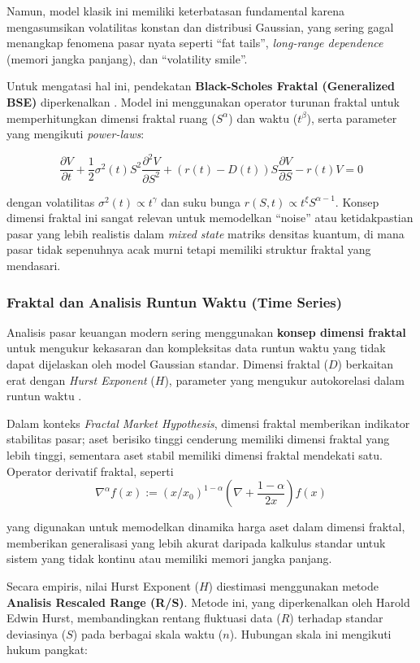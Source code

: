 Namun, model klasik ini memiliki keterbatasan fundamental karena mengasumsikan volatilitas konstan dan distribusi Gaussian, yang sering gagal menangkap fenomena pasar nyata seperti ``fat tails'', \textit{long-range dependence} (memori jangka panjang), dan ``volatility smile''.

Untuk mengatasi hal ini, pendekatan \textbf{Black-Scholes Fraktal (Generalized BSE)} diperkenalkan \citep{el-nabulsi_qualitative_2025}. Model ini menggunakan operator turunan fraktal untuk memperhitungkan dimensi fraktal ruang ($S^\alpha$) dan waktu ($t^\beta$), serta parameter yang mengikuti \textit{power-laws}:

\[ \frac{\partial V}{\partial t} + \frac{1}{2}\sigma^2(t)S^2 \frac{\partial^2 V}{\partial S^2} + (r(t) - D(t))S \frac{\partial V}{\partial S} - r(t)V = 0 \]

dengan volatilitas $\sigma^2(t) \propto t^\gamma$ dan suku bunga $r(S,t) \propto t^\xi S^{\alpha-1}$. Konsep dimensi fraktal ini sangat relevan untuk memodelkan ``noise'' atau ketidakpastian pasar yang lebih realistis dalam \textit{mixed state} matriks densitas kuantum, di mana pasar tidak sepenuhnya acak murni tetapi memiliki struktur fraktal yang mendasari.

\subsubsection{Fraktal dan Analisis Runtun Waktu (Time Series)}
Analisis pasar keuangan modern sering menggunakan \textbf{konsep dimensi fraktal} untuk mengukur kekasaran dan kompleksitas data runtun waktu yang tidak dapat dijelaskan oleh model Gaussian standar. Dimensi fraktal ($D$) berkaitan erat dengan \textit{Hurst Exponent} ($H$), parameter yang mengukur autokorelasi dalam runtun waktu \citep{el-nabulsi_qualitative_2025}.

Dalam konteks \textit{Fractal Market Hypothesis}, dimensi fraktal memberikan indikator stabilitas pasar; aset berisiko tinggi cenderung memiliki dimensi fraktal yang lebih tinggi, sementara aset stabil memiliki dimensi fraktal mendekati satu. Operator derivatif fraktal, seperti
\[ \nabla^\alpha f(x) := (x/x_0)^{1-\alpha}(\nabla + \frac{1-\alpha}{2x})f(x) \]

yang digunakan untuk memodelkan dinamika harga aset dalam dimensi fraktal, memberikan generalisasi yang lebih akurat daripada kalkulus standar untuk sistem yang tidak kontinu atau memiliki memori jangka panjang.

Secara empiris, nilai Hurst Exponent ($H$) diestimasi menggunakan metode \textbf{Analisis Rescaled Range (R/S)}. Metode ini, yang diperkenalkan oleh Harold Edwin Hurst, membandingkan rentang fluktuasi data ($R$) terhadap standar deviasinya ($S$) pada berbagai skala waktu ($n$). Hubungan skala ini mengikuti hukum pangkat:

